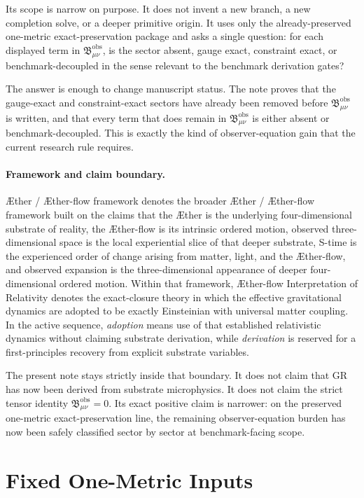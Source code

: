 \documentclass[11pt]{article}
\newcommand{\Aether}{\AE{}ther}
\newcommand{\Aflow}{\AE{}ther-flow}
\newcommand{\TheoryName}{\Aflow{} Interpretation of Relativity}
\newcommand{\TheoryProgram}{\Aether{} / \Aflow{} framework}
\newcommand{\ObsBurden}{\mathfrak B_{\mu\nu}^{\mathrm{obs}}}
\begin{document}
Its scope is narrow on purpose. It does not invent a new branch, a new completion solve, or a deeper primitive origin. It uses only the already-preserved one-metric exact-preservation package and asks a single question: for each displayed term in \(\ObsBurden\), is the sector absent, gauge exact, constraint exact, or benchmark-decoupled in the sense relevant to the benchmark derivation gates?

The answer is enough to change manuscript status. The note proves that the gauge-exact and constraint-exact sectors have already been removed before \(\ObsBurden\) is written, and that every term that does remain in \(\ObsBurden\) is either absent or benchmark-decoupled. This is exactly the kind of observer-equation gain that the current research rule requires.

\paragraph{Framework and claim boundary.}
\TheoryProgram{} denotes the broader \Aether{} / \Aflow{} framework built on the claims that the \Aether{} is the underlying four-dimensional substrate of reality, the \Aflow{} is its intrinsic ordered motion, observed three-dimensional space is the local experiential slice of that deeper substrate, S-time is the experienced order of change arising from matter, light, and the \Aflow{}, and observed expansion is the three-dimensional appearance of deeper four-dimensional ordered motion. Within that framework, \TheoryName{} denotes the exact-closure theory in which the effective gravitational dynamics are adopted to be exactly Einsteinian with universal matter coupling. In the active sequence, \emph{adoption} means use of that established relativistic dynamics without claiming substrate derivation, while \emph{derivation} is reserved for a first-principles recovery from explicit substrate variables.

The present note stays strictly inside that boundary. It does not claim that GR has now been derived from substrate microphysics. It does not claim the strict tensor identity \(\ObsBurden=0\). Its exact positive claim is narrower: on the preserved one-metric exact-preservation line, the remaining observer-equation burden has now been safely classified sector by sector at benchmark-facing scope.

\section{Fixed One-Metric Inputs}
\end{document}
